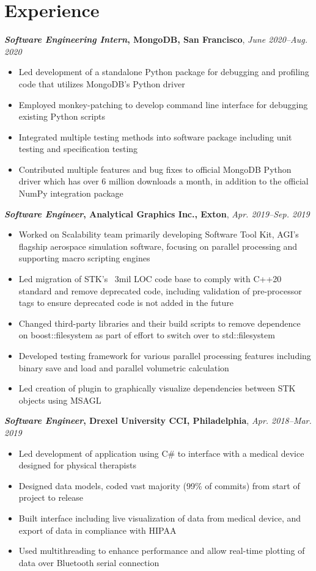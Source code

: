 \documentclass[11pt, a4paper]{article}
\begin{document}
\section*{Experience}
\textbf{\emph{Software Engineering Intern}, MongoDB, San Francisco}, \textit{June 2020--Aug. 2020}
\begin{itemize}
	\item Led development of a standalone Python package for debugging and profiling code that utilizes MongoDB's Python driver
	\item Employed monkey-patching to develop command line interface for debugging existing Python scripts
	\item Integrated multiple testing methods into software package including unit testing and specification testing
	\item Contributed multiple features and bug fixes to official MongoDB Python driver which has over 6 million downloads a month, in addition to the official NumPy integration package
     \end{itemize}
\vspace{1mm}
\textbf{\emph{Software Engineer}, Analytical Graphics Inc., Exton}, \textit{Apr. 2019--Sep. 2019}
\begin{itemize}
	\item Worked on Scalability team primarily developing Software Tool Kit, AGI's flagship aerospace simulation software, focusing on parallel processing and supporting macro scripting engines
     \item Led migration of STK's ~3mil LOC code base to comply with C++20 standard and remove deprecated code, including validation of pre-processor tags to ensure deprecated code is not added in the future
     \item Changed third-party libraries and their build scripts to remove dependence on boost::filesystem as part of effort to switch over to std::filesystem
     \item Developed testing framework for various parallel processing features including binary save and load and parallel volumetric calculation
     \item Led creation of plugin to graphically visualize dependencies between STK objects using MSAGL
     \end{itemize}
\vspace{1mm}
\textbf{\emph{Software Engineer}, Drexel University CCI, Philadelphia}, \textit{Apr. 2018--Mar. 2019}
\begin{itemize}
     \item Led development of application using C\# to interface with a medical device designed for physical therapists
     \item Designed data models, coded vast majority (99\% of commits) from start of project to release
     \item Built interface including live visualization of data from medical device, and export of data in compliance with HIPAA
     \item Used multithreading to enhance performance and allow real-time plotting of data over Bluetooth serial connection
     \end{itemize}
\end{document}
